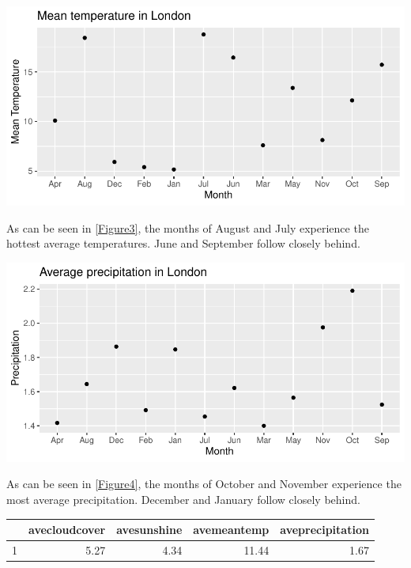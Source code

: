 \documentclass[11pt,preprint, authoryear]{elsarticle}
\let\origfigure\figure
\let\endorigfigure\endfigure
\renewenvironment{figure}[1][2] {
    \expandafter\origfigure\expandafter[H]
} {
    \endorigfigure
}
\let\origtable\table
\let\endorigtable\endtable
\renewenvironment{table}[1][2] {
    \expandafter\origtable\expandafter[H]
} {
    \endorigtable
}
\numberwithin{equation}{section}
\numberwithin{figure}{section}
\numberwithin{table}{section}
\begin{document}
\begin{figure}[H]

{\centering \includegraphics{Question2_files/figure-latex/Figure3-1} 

}

\caption{Mean temperature \label{Figure3}}\label{fig:Figure3}
\end{figure}

As can be seen in \ref{Figure3}, the months of August and July
experience the hottest average temperatures. June and September follow
closely behind.

\begin{figure}[H]

{\centering \includegraphics{Question2_files/figure-latex/Figure4-1} 

}

\caption{Mean precipitation \label{Figure4}}\label{fig:Figure4}
\end{figure}

As can be seen in \ref{Figure4}, the months of October and November
experience the most average precipitation. December and January follow
closely behind.

\begin{table}[H]
\centering
\begin{tabular}{rrrrr}
  \hline
 & avecloudcover & avesunshine & avemeantemp & aveprecipitation \\ 
  \hline
1 & 5.27 & 4.34 & 11.44 & 1.67 \\ 
   \hline
\end{tabular}
\caption{Average values throughout the year \label{tab1}} 
\end{table}
\end{document}
